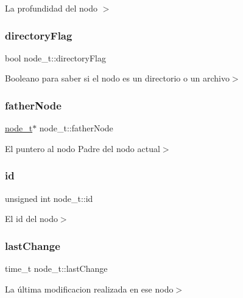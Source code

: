 La profundidad del nodo $>$ \mbox{\label{structnode__t_a86637ae4679009b157317c3fa701e148}} 
\subsubsection{\texorpdfstring{directory\+Flag}{directoryFlag}}
{\footnotesize\ttfamily bool node\+\_\+t\+::directory\+Flag}

Booleano para saber si el nodo es un directorio o un archivo$>$ \mbox{\label{structnode__t_a677649fc87677fd268566458fabf99db}} 
\subsubsection{\texorpdfstring{father\+Node}{fatherNode}}
{\footnotesize\ttfamily \hyperlink{structnode__t}{node\+\_\+t}$\ast$ node\+\_\+t\+::father\+Node}

El puntero al nodo Padre del nodo actual$>$ \mbox{\label{structnode__t_a3d32f150f8a692d43e545b8b53eb856e}} 
\subsubsection{\texorpdfstring{id}{id}}
{\footnotesize\ttfamily unsigned int node\+\_\+t\+::id}

El id del nodo$>$ \mbox{\label{structnode__t_ad505eaabfc4f22a4a982c80403e26f13}} 
\subsubsection{\texorpdfstring{last\+Change}{lastChange}}
{\footnotesize\ttfamily time\+\_\+t node\+\_\+t\+::last\+Change}

La última modificacion realizada en ese nodo$>$ \mbox{\label{structnode__t_a202c45b136037819d05bdd73728de399}} 
